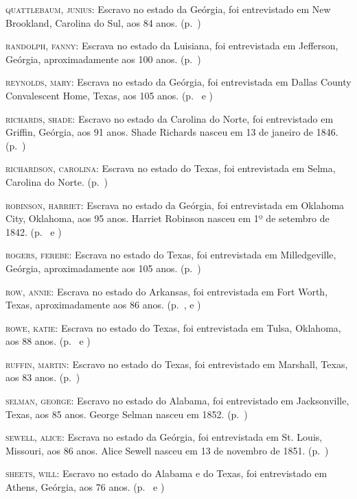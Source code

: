 \begin{Parskip}
\textsc{quattlebaum, junius:} Escravo no estado da Geórgia, foi
entrevistado em New Brookland, Carolina do Sul, aos 84 anos. (p.~\pageref{ref220})

\textsc{randolph, fanny:} Escrava no estado da Luisiana, foi entrevistada
em Jefferson, Geórgia, aproximadamente aos 100 anos. (p.~\pageref{ref221})

\textsc{reynolds, mary:} Escrava no estado da Geórgia, foi entrevistada
em Dallas County Convalescent Home, Texas, aos 105 anos. (p.~\pageref{ref222} e \pageref{ref223})

\textsc{richards, shade:} Escravo no estado da Carolina do Norte, foi
entrevistado em Griffin, Geórgia, aos 91 anos. Shade Richards nasceu em
13 de janeiro de 1846. (p.~\pageref{ref224})

\textsc{richardson, carolina:} Escrava no estado do Texas, foi
entrevistada em Selma, Carolina do Norte. (p.~\pageref{ref225})

\textsc{robinson, harriet:} Escrava no estado da Geórgia, foi
entrevistada em Oklahoma City, Oklahoma, aos 95 anos. Harriet Robinson
nasceu em 1º de setembro de 1842. (p.~\pageref{ref226} e \pageref{ref227})

\textsc{rogers, ferebe:} Escrava no estado do Texas, foi entrevistada em
Milledgeville, Geórgia, aproximadamente aos 105 anos. (p.~\pageref{ref228})

\textsc{row, annie:} Escrava no estado do Arkansas, foi entrevistada em
Fort Worth, Texas, aproximadamente aos 86 anos. (p.~\pageref{ref229}, \pageref{ref230} e \pageref{ref231})

\textsc{rowe, katie:} Escrava no estado do Texas, foi entrevistada em
Tulsa, Oklahoma, aos 88 anos. (p.~\pageref{ref232} e \pageref{ref233})

\textsc{ruffin, martin:} Escravo no estado do Texas, foi entrevistado em
Marshall, Texas, aos 83 anos. (p.~\pageref{ref234})

\textsc{selman, george:} Escravo no estado do Alabama, foi entrevistado
em Jacksonville, Texas, aos 85 anos. George Selman nasceu em 1852. (p.~\pageref{ref235})

\textsc{sewell, alice:} Escrava no estado da Geórgia, foi entrevistada
em St. Louis, Missouri, aos 86 anos. Alice Sewell nasceu em 13 de
novembro de 1851. (p.~\pageref{ref236})

\textsc{sheets, will:} Escravo no estado do Alabama e do Texas, foi
entrevistado em Athens, Geórgia, aos 76 anos. (p.~\pageref{ref237} e \pageref{ref238})


\end{Parskip}
